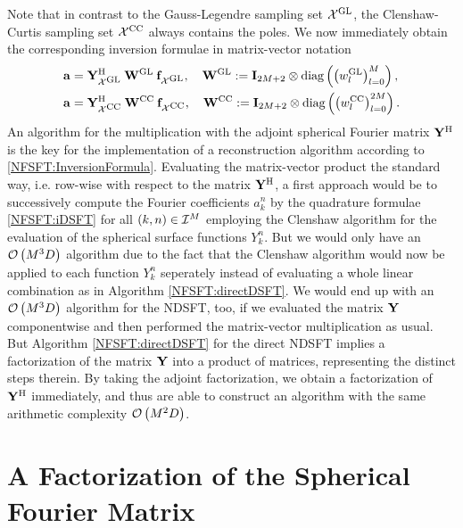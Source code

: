 Note that in contrast to the Gauss-Legendre sampling set $\mathcal{X}^{\mbox{\scriptsize\rm{GL}}}$,
the Clenshaw-Curtis sampling set $\mathcal{X}^{\mbox{\scriptsize\rm{CC}}}$ always contains the poles.
We now immediately obtain the corresponding inversion formulae in matrix-vector notation
\begin{equation}
  \label{NFSFT:InversionFormula}
  \begin{split}
    \mathbf{a} & = \mathbf{Y}_{\mathcal{X}^{\mbox{\scriptsize\rm{GL}}}}^{\text{\rm{H}}} \: \mathbf{W}^{\mbox{\scriptsize\rm{GL}}} \:
    \mathbf{f}_{\mathcal{X}^{\mbox{\scriptsize\rm{GL}}}},\quad \mathbf{W}^{\mbox{\scriptsize\rm{GL}}} := \mathbf{I}_{2M+2} 
    \otimes \text{\rm{diag}}\left(\left(w_{l}^{\mbox{\scriptsize\rm{GL}}}\right)_{l=0}^M\right),\\
    \mathbf{a} & = \mathbf{Y}_{\mathcal{X}^{\mbox{\scriptsize\rm{CC}}}}^{\text{\rm{H}}} \: \mathbf{W}^{\mbox{\scriptsize\rm{CC}}} \:
    \mathbf{f}_{\mathcal{X}^{\mbox{\scriptsize\rm{CC}}}},\quad \mathbf{W}^{\mbox{\scriptsize\rm{CC}}} := \mathbf{I}_{2M+2} 
    \otimes \text{\rm{diag}}\left(\left(w_{l}^{\mbox{\scriptsize\rm{CC}}}\right)_{l=0}^{2M}\right).
  \end{split}  
\end{equation}  
An algorithm for the multiplication with the adjoint spherical Fourier matrix $\mathbf{Y}^{\text{\rm{H}}}$ is 
the key for the implementation of a reconstruction algorithm according to 
\eqref{NFSFT:InversionFormula}. Evaluating the
matrix-vector product the standard way, i.e. row-wise with respect to the matrix $\mathbf{Y}^{\text{\rm{H}}}$, 
a first approach 
would be to successively compute the Fourier coefficients $a_{k}^n$ by the quadrature formulae 
\eqref{NFSFT:iDSFT} for all $\left(k,n\right) \in \mathcal{I}^M$ employing the Clenshaw 
algorithm for the evaluation of the spherical surface functions $Y_{k}^n$. But we would only have an 
$\mathcal{O}\left(M^3 D\right)$ algorithm due to the fact that the Clenshaw algorithm would now be 
applied to each function $Y_{k}^n$ seperately instead of evaluating a whole linear 
combination as in Algorithm \ref{NFSFT:directDSFT}. 
We would end up with an $\mathcal{O}\left(M^3 D\right)$ algorithm for the NDSFT, too, if we 
evaluated the matrix $\mathbf{Y}$ componentwise and then performed the matrix-vector multiplication 
as usual. But Algorithm \ref{NFSFT:directDSFT} for the direct NDSFT implies a factorization of 
the matrix $\mathbf{Y}$ into a product of matrices, representing the distinct steps therein.
By taking the adjoint factorization, we obtain a factorization of $\mathbf{Y}^{\text{\rm{H}}}$ immediately, and 
thus are able to construct an algorithm with the same arithmetic complexity $\mathcal{O}\left(M^2 D\right)$.

\section{A Factorization of the Spherical Fourier Matrix}
\label{NFSFT:Factorization}

